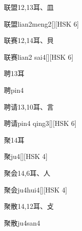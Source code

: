 \begin{Entry}{联盟}{12,13}{⽿、⽫}
  \begin{Phonetics}{联盟}{lian2meng2}[][HSK 6]
  \end{Phonetics}
\end{Entry}

\begin{Entry}{联赛}{12,14}{⽿、⾙}
  \begin{Phonetics}{联赛}{lian2 sai4}[][HSK 6]
  \end{Phonetics}
\end{Entry}

\begin{Entry}{聘}{13}{⽿}
  \begin{Phonetics}{聘}{pin4}
  \end{Phonetics}
\end{Entry}

\begin{Entry}{聘请}{13,10}{⽿、⾔}
  \begin{Phonetics}{聘请}{pin4 qing3}[][HSK 6]
  \end{Phonetics}
\end{Entry}

\begin{Entry}{聚}{14}{⽿}
  \begin{Phonetics}{聚}{ju4}[][HSK 4]
  \end{Phonetics}
\end{Entry}

\begin{Entry}{聚会}{14,6}{⽿、⼈}
  \begin{Phonetics}{聚会}{ju4hui4}[][HSK 4]
  \end{Phonetics}
\end{Entry}

\begin{Entry}{聚散}{14,12}{⽿、⽁}
  \begin{Phonetics}{聚散}{ju4san4}
  \end{Phonetics}
\end{Entry}

